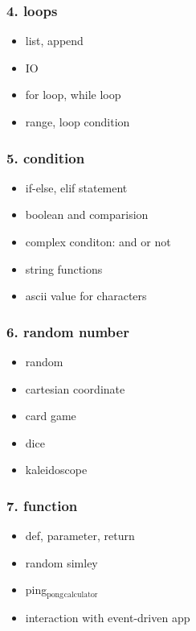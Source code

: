 \documentclass[11pt]{article}
\begin{document}
\subsubsection{4. loops}
\label{sec:orgfad3b07}
\begin{itemize}
\item list, append
\item IO
\item for loop, while loop
\item range, loop condition
\end{itemize}

\subsubsection{5. condition}
\label{sec:org51e2ad5}
\begin{itemize}
\item if-else, elif statement
\item boolean and comparision
\item complex conditon: and or not
\item string functions
\item ascii value for characters
\end{itemize}

\subsubsection{6. random number}
\label{sec:orgd587749}
\begin{itemize}
\item random
\item cartesian coordinate
\item card game
\item dice
\item kaleidoscope
\end{itemize}

\subsubsection{7. function}
\label{sec:org0acb3f8}
\begin{itemize}
\item def, parameter, return
\item random simley
\item ping\(_{\text{pong}}\)\(_{\text{calculator}}\)
\item interaction with event-driven app
\end{itemize}
\end{document}
